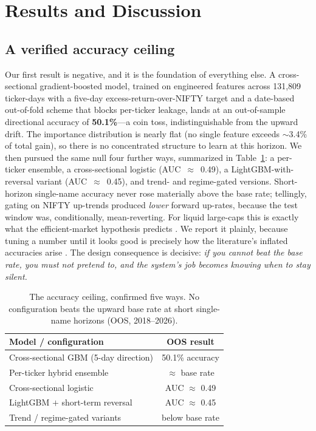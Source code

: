 \documentclass[conference]{IEEEtran}
\begin{document}
\section{Results and Discussion}
\label{sec:results}

\subsection{A verified accuracy ceiling}
\label{sec:ceiling}
Our first result is negative, and it is the foundation of everything else. A
cross-sectional gradient-boosted model, trained on engineered features across
131{,}809 ticker-days with a five-day excess-return-over-NIFTY target and a
date-based out-of-fold scheme that blocks per-ticker leakage, lands at an
out-of-sample directional accuracy of \textbf{50.1\%}---a coin toss,
indistinguishable from the upward drift. The importance distribution is nearly flat
(no single feature exceeds $\sim$3.4\% of total gain), so there is no concentrated
structure to learn at this horizon. We then pursued the same null four further
ways, summarized in Table~\ref{tab:ceiling}: a per-ticker ensemble, a
cross-sectional logistic (AUC~$\approx$~0.49), a LightGBM-with-reversal variant
(AUC~$\approx$~0.45), and trend- and regime-gated versions. Short-horizon
single-name accuracy never rose materially above the base rate; tellingly, gating
on NIFTY up-trends produced \emph{lower} forward up-rates, because the test window
was, conditionally, mean-reverting. For liquid large-caps this is exactly what the
efficient-market hypothesis predicts \cite{fama1970}. We report it plainly, because
tuning a number until it looks good is precisely how the literature's inflated
accuracies arise \cite{bailey2014,harvey2016}. The design consequence is decisive:
\emph{if you cannot beat the base rate, you must not pretend to, and the system's
job becomes knowing when to stay silent.}

\begin{table}[t]
\centering
\caption{The accuracy ceiling, confirmed five ways. No configuration beats the
upward base rate at short single-name horizons (OOS, 2018--2026).}
\label{tab:ceiling}
\renewcommand{\arraystretch}{1.2}
\small
\begin{tabular}{@{}l c@{}}
\toprule
\textbf{Model / configuration} & \textbf{OOS result} \\
\midrule
Cross-sectional GBM (5-day direction)      & 50.1\% accuracy \\
Per-ticker hybrid ensemble                 & $\approx$ base rate \\
Cross-sectional logistic                   & AUC $\approx$ 0.49 \\
LightGBM $+$ short-term reversal           & AUC $\approx$ 0.45 \\
Trend / regime-gated variants              & below base rate \\
\bottomrule
\end{tabular}
\end{table}
\end{document}
